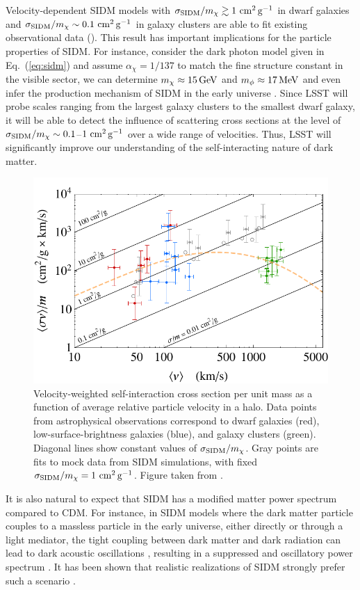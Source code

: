 Velocity-dependent SIDM models with $\sigma_{\rm SIDM}/m_\chi \gtrsim 1 \mathrm{\,\mathrm{\,cm}^2\mathrm{\,g}^{-1}}$ in dwarf galaxies and $\sigma_{\rm SIDM}/m_\chi \sim 0.1 \mathrm{\,\mathrm{\,cm}^2\mathrm{\,g}^{-1}}$ in galaxy clusters are able to fit existing observational data (). This result has important implications for the particle properties of SIDM. For instance, consider the dark photon model given in Eq.~(\ref{eq:sidm}) and assume $\alpha_\chi=1/137$ to match the fine structure constant in the visible sector, we can determine $m_\chi\approx 15 \mathrm{\,GeV}$ and $m_\phi \approx 17 \mathrm{\,MeV}$ \citep{Kaplinghat:2015aga} and even infer the production mechanism of SIDM in the early universe \citep{Huo:2017vef}. Since LSST will probe scales ranging from the largest galaxy clusters to the smallest dwarf galaxy, it will be able to detect the influence of scattering cross sections at the level of $\sigma_{\rm SIDM}/m_\chi \sim 0.1$--$1 \mathrm{\,\mathrm{\,cm}^2\mathrm{\,g}^{-1}}$ over a wide range of velocities. Thus, LSST will significantly improve our understanding of the self-interacting nature of dark matter. 

\begin{figure}
\centering
\includegraphics[width=0.6\columnwidth]{figures/sigmav.pdf}
\caption{Velocity-weighted self-interaction cross section per unit mass as a function of average relative particle velocity in a halo. Data points from astrophysical observations correspond to dwarf galaxies (red), low-surface-brightness galaxies (blue), and galaxy clusters (green). 
Diagonal lines show constant values of $\sigma_{\rm SIDM}/m_\chi$. 
Gray points are fits to mock data from SIDM simulations, with fixed $\sigma_{\rm SIDM}/m_\chi = 1 \mathrm{\,\mathrm{\,cm}^2\mathrm{\,g}^{-1}}$.
Figure taken from \citet{Kaplinghat:2015aga}.
}
\label{fig:sidm_sigma}
\end{figure}

It is also natural to expect that SIDM has a modified matter power spectrum compared to CDM. For instance, in SIDM models where the dark matter particle couples to a massless particle in the early universe, either directly or through a light mediator, the tight coupling between dark matter and dark radiation can lead to dark acoustic oscillations \citep{Cyr-Racine:2013ab,Cyr-Racine:2013fsa}, resulting in a suppressed and oscillatory power spectrum \citep[\eg][]{1992ApJ...398...43C,Boehm:2001hm,Boehm:2004th,Feng:2009mn,Aarssen:2012fx}. It has been shown that realistic realizations of SIDM strongly prefer such a scenario \citep{ Huo:2017vef}.

